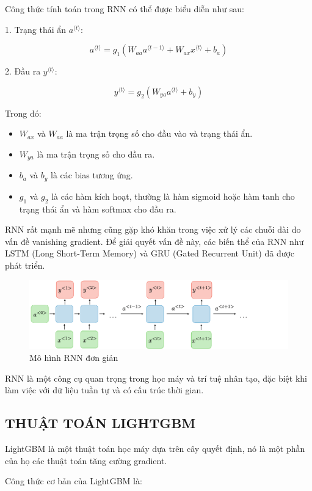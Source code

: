 \documentclass[conference]{IEEEtran}
\begin{document}
Công thức tính toán trong RNN có thể được biểu diễn như sau:

1. Trạng thái ẩn \(a^{\langle t \rangle}\):

\[
a^{\langle t \rangle} = g_1 \left( W_{aa} a^{\langle t-1 \rangle} + W_{ax} x^{\langle t \rangle} + b_a \right)
\]

2. Đầu ra \(y^{\langle t \rangle}\):

\[
y^{\langle t \rangle} = g_2 \left( W_{ya} a^{\langle t \rangle} + b_y \right)
\]

Trong đó:
\begin{itemize}
    \item \(W_{ax}\) và \(W_{aa}\) là ma trận trọng số cho đầu vào và trạng thái ẩn.
    \item \(W_{ya}\) là ma trận trọng số cho đầu ra.
    \item \(b_a\) và \(b_y\) là các bias tương ứng.
    \item \(g_1\) và \(g_2\) là các hàm kích hoạt, thường là hàm sigmoid hoặc hàm tanh cho trạng thái ẩn và hàm softmax cho đầu ra.
\end{itemize}

RNN rất mạnh mẽ nhưng cũng gặp khó khăn trong việc xử lý các chuỗi dài do vấn đề vanishing gradient. Để giải quyết vấn đề này, các biến thể của RNN như LSTM (Long Short-Term Memory) và GRU (Gated Recurrent Unit) đã được phát triển.

\begin{figure}
    \centering
    \includegraphics[width=0.5\linewidth]{image.png}
    \caption{Mô hình RNN đơn giản}
    \label{fig:rnn}
\end{figure}

RNN là một công cụ quan trọng trong học máy và trí tuệ nhân tạo, đặc biệt khi làm việc với dữ liệu tuần tự và có cấu trúc thời gian.


\subsection{THUẬT TOÁN LIGHTGBM}

LightGBM là một thuật toán học máy dựa trên cây quyết định, nó là một phần của họ các thuật toán tăng cường gradient.

Công thức cơ bản của LightGBM là:
\end{document}

